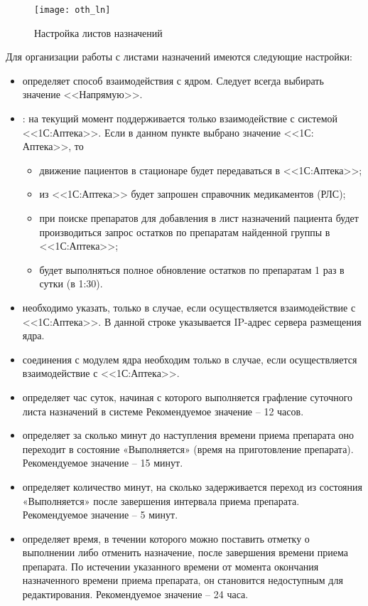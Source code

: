 \begin{figure}[ht]\centering
 \texttt{[image: oth\_ln]}
 \caption{Настройка листов назначений}
 \label{img_oth_ln}
\end{figure}

Для организации работы с листами назначений имеются следующие настройки:
\begin{itemize}
 \item {} определяет способ взаимодействия с ядром. Следует всегда выбирать значение <<Напрямую>>.
 \item {}: на текущий момент поддерживается только взаимодействие с системой <<1С:Аптека>>. Если в данном пункте выбрано значение <<1С: Аптека>>, то
 \begin{itemize}
  \item движение пациентов в стационаре будет передаваться в <<1С:Аптека>>;
  \item из <<1С:Аптека>> будет запрошен справочник медикаментов (РЛС);
  \item при поиске препаратов для добавления в лист назначений пациента будет производиться запрос остатков по препаратам найденной группы в <<1С:Аптека>>;
  \item будет выполняться полное обновление остатков по препаратам 1 раз в сутки (в 1:30).
 \end{itemize} 
 \item {} необходимо указать, только в случае, если осуществляется взаимодействие с <<1С:Аптека>>. В данной строке указывается IP-адрес сервера размещения ядра.
 \item {} соединения с модулем ядра необходим только в случае, если осуществляется взаимодействие с <<1С:Аптека>>.
 \item {} определяет час суток, начиная с которого выполняется графление суточного листа назначений в системе Рекомендуемое значение – 12 часов.
 \item {} определяет за сколько минут до наступления времени приема препарата оно переходит в состояние «Выполняется» (время на приготовление препарата). Рекомендуемое значение – 15 минут.
 \item {} определяет количество минут, на сколько задерживается переход из состояния «Выполняется» после завершения интервала приема препарата. Рекомендуемое значение – 5 минут.
 \item {} определяет время, в течении которого можно поставить отметку о выполнении либо отменить назначение, после завершения времени приема препарата. По истечении указанного времени от момента окончания назначенного времени приема препарата, он становится недоступным для редактирования. Рекомендуемое значение – 24 часа.
\end{itemize} 

